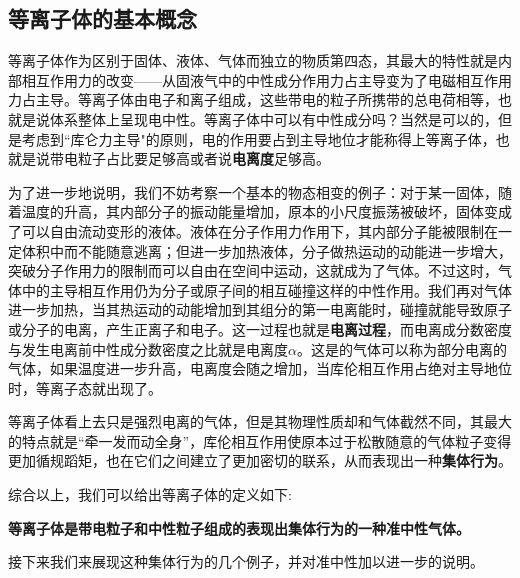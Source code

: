 
\begin{issues}
\issueDraft       %
\end{issues}



\subsection{等离子体的基本概念}

等离子体作为区别于固体、液体、气体而独立的物质第四态，其最大的特性就是内部相互作用力的改变——从固液气中的中性成分作用力占主导变为了电磁相互作用力占主导。等离子体由电子和离子组成，这些带电的粒子所携带的总电荷相等，也就是说体系整体上呈现电中性。等离子体中可以有中性成分吗？当然是可以的，但是考虑到“库仑力主导"的原则，电的作用要占到主导地位才能称得上等离子体，也就是说带电粒子占比要足够高或者说\textbf{电离度}足够高。
		
为了进一步地说明，我们不妨考察一个基本的物态相变的例子：对于某一固体，随着温度的升高，其内部分子的振动能量增加，原本的小尺度振荡被破坏，固体变成了可以自由流动变形的液体。液体在分子作用力作用下，其内部分子能被限制在一定体积中而不能随意逃离；但进一步加热液体，分子做热运动的动能进一步增大，突破分子作用力的限制而可以自由在空间中运动，这就成为了气体。不过这时，气体中的主导相互作用仍为分子或原子间的相互碰撞这样的中性作用。我们再对气体进一步加热，当其热运动的动能增加到其组分的第一电离能时，碰撞就能导致原子或分子的电离，产生正离子和电子。这一过程也就是\textbf{电离过程}，而电离成分数密度与发生电离前中性成分数密度之比就是电离度$\alpha$。这是的气体可以称为部分电离的气体，如果温度进一步升高，电离度会随之增加，当库伦相互作用占绝对主导地位时，等离子态就出现了。
		
等离子体看上去只是强烈电离的气体，但是其物理性质却和气体截然不同，其最大的特点就是“牵一发而动全身”，库伦相互作用使原本过于松散随意的气体粒子变得更加循规蹈矩，也在它们之间建立了更加密切的联系，从而表现出一种\textbf{集体行为}。
		
综合以上，我们可以给出等离子体的定义如下:
		
\textbf{等离子体是带电粒子和中性粒子组成的表现出集体行为的一种准中性气体。}
		
接下来我们来展现这种集体行为的几个例子，并对准中性加以进一步的说明。

